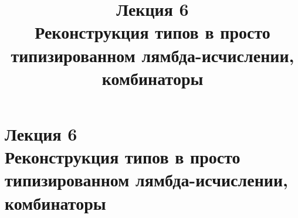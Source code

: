 \documentclass[12pt, a4paper]{article}
\begin{document}
\theoremstyle{definition}
\newtheorem{definition}{Определение}[section]
\newtheorem{note}{Замечание}[section]
\newtheorem*{example}{Пример}
\newtheorem{theorem}{Теорема}[section]
\newtheorem{axiom}{Аксиома}[section]
\newtheorem{lemma}[theorem]{Лемма}
\newtheorem{statement}{Утверждение}[section]
\newtheorem{oun_paragraph}{Пункт}[section]
\def\from#1{\par \parbox{0.7\textwidth}{\par \hfill\raggedleft \it #1}} 

	\begin{titlepage}
		\title{Лекция 6 \\ Реконструкция типов в просто типизированном лямбда-исчислении, комбинаторы}
		\date{}
	\end{titlepage}
		\maketitle
		
		
		
		
		\section{Лекция 6 \\ Реконструкция типов в просто типизированном лямбда-исчислении, комбинаторы}
\end{document}
